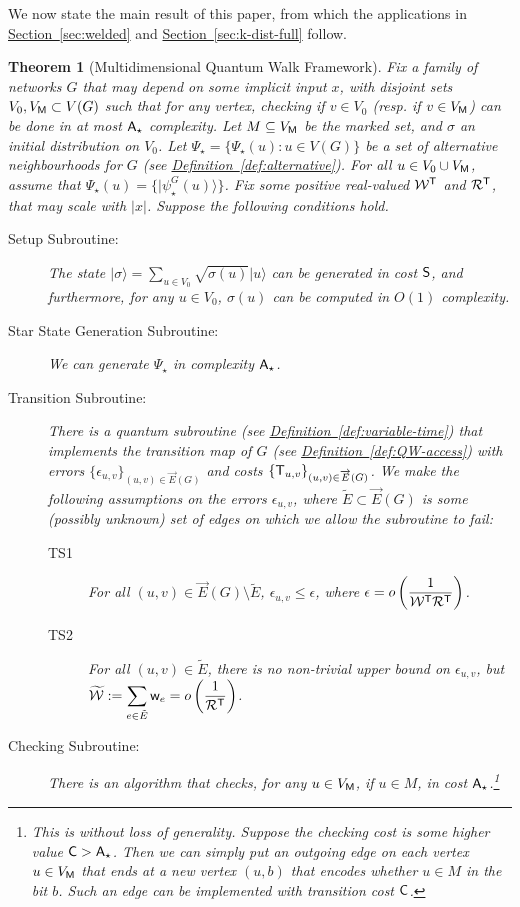 \documentclass{article}
\newtheorem{theorem}{Theorem}\newtheorem{lemma}[theorem]{Lemma}\newtheorem{proposition}[theorem]{Proposition}\newtheorem{corollary}[theorem]{Corollary}\newtheorem{definition}[theorem]{Definition}\newtheorem{claim}[theorem]{Claim}\newtheorem{remark}[theorem]{Remark}\newenvironment{cfigure}[1][htbp]{\begin{figure}[#1]\centering}{\end{figure}}
\renewcommand{\sec}[1]{\hyperref[sec:#1]{Section~\ref*{sec:#1}}}
\newcommand{\defin}[1]{\hyperref[def:#1]{Definition~\ref*{def:#1}}}
\def\ket#1{{\lvert}#1\rangle}
\renewcommand{\>}{\rangle}
\newcommand{\<}{\langle}
\renewcommand{\(}{\left(}
\renewcommand{\)}{\right)}
\def\w{{\sf w}}
\begin{document}
We now state the main result of this paper, from which the applications in \sec{welded} and \sec{k-dist-full} follow. 

\begin{theorem}[Multidimensional Quantum Walk Framework]\label{thm:full-framework}
Fix a family of networks $G$ that may depend on some implicit input $x$, with disjoint sets $V_0,V_{\sf M}\subset V(G)$ such that for any vertex, checking if $v\in V_0$ (resp. if $v\in V_{\sf M}$) can be done in at most ${\sf A}_\star$ complexity. Let $M\subseteq V_{\sf M}$ be the \emph{marked set}, and $\sigma$ an \emph{initial distribution} on $V_0$. Let $\Psi_\star=\{\Psi_\star(u):u\in V(G)\}$ be a set of alternative neighbourhoods for $G$ (see \defin{alternative}). 
For all $u\in V_0\cup V_{\sf M}$, assume that $\Psi_\star(u)=\{\ket{\psi_\star^G(u)}\}$. 
Fix some positive real-valued ${\cal W}^{\sf T}$ and ${\cal R}^{\sf T}$, that may scale with $|x|$.
Suppose the following conditions hold.
\begin{description}
\item[Setup Subroutine:] The state $\ket{\sigma}=\sum_{u\in V_0}\sqrt{\sigma(u)}\ket{u}$ can be generated in cost ${\sf S}$, and furthermore, for any $u\in V_0$, $\sigma(u)$ can be computed in $O(1)$ complexity. 
\item[Star State Generation Subroutine:] We can generate $\Psi_\star$ in complexity ${\sf A}_\star$.
\item[Transition Subroutine:] There is a quantum subroutine (see \defin{variable-time}) that implements the transition map of $G$ (see \defin{QW-access}) 
with errors $\{\epsilon_{u,v}\}_{(u,v)\in\overrightarrow{E}(G)}$ and costs $\{{\sf T}_{u,v}\}_{(u,v)\in\overrightarrow{E}(G)}$. We make the following assumptions on the errors $\epsilon_{u,v}$, where $\tilde{E}\subset\overrightarrow{E}(G)$ is some (possibly unknown) set of edges on which we allow the subroutine to fail:
	\begin{description}
	\item[TS1] For all $(u,v)\in\overrightarrow{E}(G)\setminus\tilde{E}$, $\epsilon_{u,v}\leq \epsilon$, where $\displaystyle\epsilon = o\left(\frac{1}{{\cal W}^{\sf T}{\cal R}^{\sf T}}\right)$. 
	\item[TS2] For all $(u,v)\in \tilde{E}$, there is no non-trivial upper bound on $\epsilon_{u,v}$, but $\displaystyle\widetilde{\cal W}:=\sum_{e\in \tilde{E}}\w_e=o\left(\frac{1}{{\cal R}^{\sf T}}\right)$. 
	\end{description}
\item[Checking Subroutine:] There is an algorithm that checks, for any $u\in V_{\sf M}$, if $u\in M$, in cost ${\sf A}_\star$.\footnote{This is without loss of generality. Suppose the checking cost is some higher value ${\sf C}>{\sf A}_\star$. Then we can simply put an outgoing edge on each vertex $u\in V_{\sf M}$ that ends at a new vertex $(u,b)$ that encodes whether $u\in M$ in the bit $b$. Such an edge can be implemented with transition cost ${\sf C}$.} 

\end{description}
\end{theorem}
\end{document}
